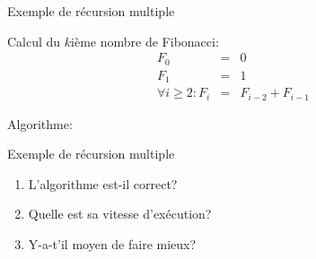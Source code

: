 \begin{frame}{Exemple de récursion multiple}

Calcul du $k$ième nombre de Fibonacci:
\begin{eqnarray*}
F_0&=&0\\
F_1&=&1\\
\forall i\geq 2: F_i& = &F_{i-2}+F_{i-1}
\end{eqnarray*}

Algorithme:
\begin{center}
\end{center}

\end{frame}

\begin{frame}{Exemple de récursion multiple}

\begin{center}
\end{center}

\bigskip

\begin{enumerate}
\item L'algorithme est-il correct?
\item Quelle est sa vitesse d'exécution?
\item Y-a-t'il moyen de faire mieux?
\end{enumerate}

\end{frame}

